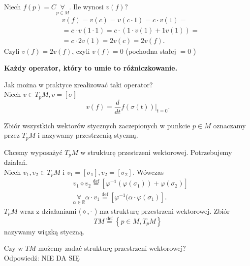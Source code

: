\documentclass[../main.tex]{subfiles}
\begin{document}
    \begin{figure}[h]
        \centering
        \label{fig:fig_52}
    \end{figure}

    \begin{przyklad}
        Niech $f(p) = C \underset{p\in M}{\forall} $. Ile wynosi $v(f)?$
         \begin{align*}
            &v(f) = v(c) = v(c \cdot 1) = c \cdot v(1) = \\
            &=  c \cdot v(1\cdot 1) = c \cdot (1 \cdot v(1) + 1v(1)) =\\
            &= c \cdot 2v(1) = 2v(c) = 2v(f)
        .\end{align*}
        Czyli $v(f) = 2v(f)$, czyli $v(f) = 0$ (pochodna stałej $=0$ )
    \end{przyklad}
    \textbf{Każdy operator, który to umie to różniczkowanie.}
    \begin{pytanie}
        Jak można w praktyce zrealizować taki operator?\\
        Niech $v\in T_pM, v=[\sigma]$
         \[
             v(f) = \frac{d}{dt}f(\sigma(t))|_{t=0}
        .\]
    \end{pytanie}

    \begin{definicja}
        Zbiór wszystkich wektorów stycznych zaczepionych w punkcie $p\in M$ oznaczamy przez  $T_pM$ i nazywamy przestrzenią styczną.
    \end{definicja}

    Chcemy wyposażyć $T_pM$ w strukturę przestrzeni wektorowej. Potrzebujemy działań.\\
    Niech $v_1,v_2\in T_pM$ i $v_1 = [\sigma_1], v_2 = [\sigma_2]$. Wówczas\\

    \begin{align*}
         &v_1 \diamond v_2 \overset{\text{def}}{=} \left[ \varphi^{-1}(\varphi(\sigma_1))+\varphi(\sigma_2) \right]\\
         &\underset{\alpha\in\mathbb{R}}{\forall} \alpha\cdot v_1 \overset{\text{def}}{=} \left[ \varphi^{-1}(\alpha\cdot \varphi(\sigma_1) \right]
    .\end{align*}
    $T_pM$ wraz z działaniami ($\diamond, \cdot $ ) ma strukturę przestrzeni wektorowej. Zbiór
    \[
        TM \overset{\text{def}}{=} \left\{ p\in M, T_pM \right\}
    \]  nazywamy wiązką styczną.

    \begin{pytanie}
        Czy w $TM$ możemy zadać strukturę przestrzeni wektorowej?\\
        Odpowiedź: NIE DA SIĘ
    \end{pytanie}
\end{document}
